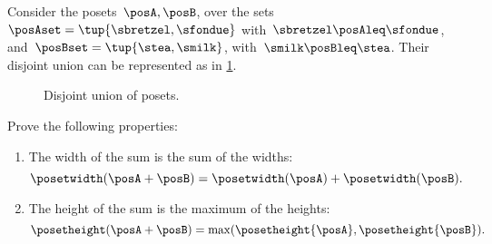 \begin{example}
    Consider the posets~$\posA,\posB$, over the sets~$\posAset=\tup{\sbretzel, \sfondue}$ with~$\sbretzel \posAleq \sfondue$, and~$\posBset=\tup{\stea,\smilk}$, with~$\smilk \posBleq \stea$.
    Their disjoint union can be represented as in \cref{fig:poset-coproduct}.

    \begin{figure}[h!]
        \centering
        \caption{Disjoint union of posets.}
        \label{fig:poset-coproduct}
    \end{figure}
\end{example}
\vfill
\begin{gradedexercise}
    \label{ex:MeasurePosetSum}

    Prove the following properties:
    \begin{enumerate}
        \item The width of the sum is the sum of the widths:
              \begin{equation}
                  \posetwidth(\posA + \posB) = \posetwidth(\posA) + \posetwidth(\posB).
              \end{equation}
        \item The height of the sum is the maximum of the heights:
              \begin{equation}
                  \posetheight(\posA + \posB) = \max(\posetheight{\posA}, \posetheight{\posB}).
              \end{equation}
    \end{enumerate}
\end{gradedexercise}
